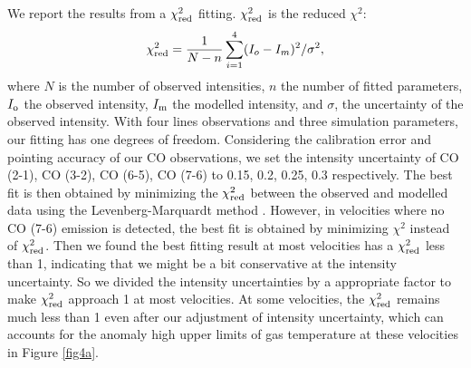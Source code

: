 We report the results from a $\chi^2_{\textup{red}}$ fitting. $\chi^2_{\textup{red}}$ is the reduced $\chi^2$: 
\begin{equation}
\chi^2_{\textup{red}} = \frac{1}{N - n} \sum_{i=1}^{4}(I_o - I_m)^2/\sigma^2,
\end{equation}
where $N$ is the number of observed intensities, $n$ the number of fitted parameters, $I_\textup{o}$ the observed intensity, $I_\textup{m}$ the modelled intensity, and $\sigma$, the uncertainty of the observed intensity. With four lines observations and three simulation parameters, our fitting has one degrees of freedom. Considering the calibration error and pointing accuracy of our CO observations, we set the intensity uncertainty of CO (2-1), CO (3-2), CO (6-5), CO (7-6) to 0.15, 0.2, 0.25, 0.3 respectively. The best fit is then obtained by minimizing the $\chi^2_{\textup{red}}$ between the observed and modelled data using the Levenberg-Marquardt method \citep{1992nrfa.book.....P}. However, in velocities where no CO (7-6) emission is detected, the best fit is obtained by minimizing $\chi^2$ instead of $\chi^2_{\textup{red}}$. Then we found the best fitting result at most velocities has a $\chi^2_{\textup{red}}$ less than 1, indicating that we might be a bit conservative at the intensity uncertainty. So we divided the intensity uncertainties by a appropriate factor to make $\chi^2_{\textup{red}}$ approach 1 at most velocities. At some velocities, the $\chi_{\textup{red}}^2$ remains much less than 1 even after our adjustment of intensity uncertainty, which can accounts for the anomaly high upper limits of gas temperature at these velocities in Figure \ref{fig4a}. 

